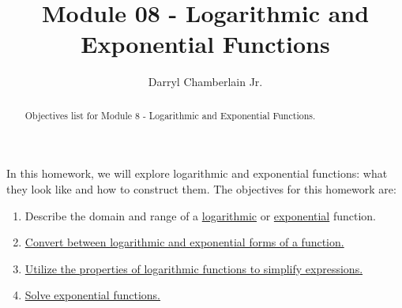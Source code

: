 \documentclass{ximera}
\author{Darryl Chamberlain Jr.}
\title{Module 08 - Logarithmic and Exponential Functions}
\begin{document}
\begin{abstract}
Objectives list for Module 8 - Logarithmic and Exponential Functions.
\end{abstract}
\maketitle

In this homework, we will explore logarithmic and exponential functions: what they look like and how to construct them.
The objectives for this homework are: 
\begin{enumerate}
	\item Describe the domain and range of a \href{https://cnx.org/contents/mwjClAV_@8.1:REGENe1G@20/Graphs-of-Logarithmic-Functions}{logarithmic} or \href{https://cnx.org/contents/mwjClAV_@8.1:c8aEyW2u@19/Graphs-of-Exponential-Functions}{exponential} function.
    \item \href{https://cnx.org/contents/mwjClAV_@8.1:dGtL5139@10/Logarithmic-Functions}{Convert between logarithmic and exponential forms of a function.}
	\item \href{https://cnx.org/contents/mwjClAV_@8.1:nVZd13Io@12/Logarithmic-Properties}{Utilize the properties of logarithmic functions to simplify expressions.}
	\item \href{https://cnx.org/contents/mwjClAV_@8.1:wfhkHyEh@11/Exponential-and-Logarithmic-Equations}{Solve exponential functions.}
\end{enumerate}
\end{document}
